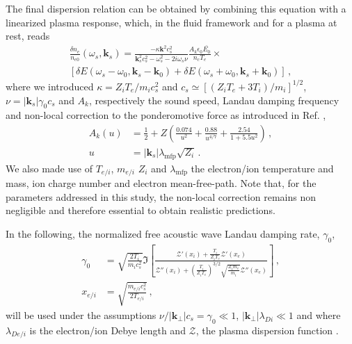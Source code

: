 \documentclass[
 reprint,
 amsmath,amssymb,
 aps,
]{revtex4-1}
\begin{document}
The final dispersion relation  can be obtained by combining this equation with a linearized plasma response, which, in the fluid framework and for a plasma at rest, %
reads 
\begin{align}
   \frac{\delta n_e }{n_{e0}}(\omega_s,\mathbf{k}_s) = \frac{-\kappa\mathbf{k}^2c_s^2}{ \mathbf{k}_s^2c_s^2-\omega_s^2 -2i\omega_s \nu} \frac{A_k\epsilon_0 \bar{E_0}}{n_c T_e}\times \nonumber\\ \left[\delta E(\omega_s-\omega_0, \mathbf{k}_s-\mathbf{k}_0) +\delta E(\omega_s+\omega_0, \mathbf{k}_s+\mathbf{k}_0) \right] \, ,\label{eq:fluid}
\end{align}
where we introduced $\kappa = Z_iT_e/m_ic_s^2$ and  $c_s\simeq [(Z_iT_e+3 T_i)/m_i]^{1/2}$, $\nu=\vert\mathbf{k}_s\vert \gamma_0 c_s$ and $A_k$, respectively  the sound speed, Landau damping frequency and non-local correction to the ponderomotive force  as introduced in Ref. \cite[]{Bychenkov_2000}, 
\begin{align}
     A_k(u)   &= \frac{1}{2} +Z\left( \frac{0.074}{u^2}+ \frac{0.88}{u^{4/7}} + \frac{2.54}{1+5.5u^2} \right) \, ,\nonumber \\ 
     u &=\vert \mathbf{k}_s \vert\lambda_\mathrm{mfp} \sqrt{Z_i}\label{eq:nl}\, .
\end{align}
We also made use of $T_{e/i}$, $m_{e/i}$ $Z_i$ and $\lambda_\mathrm{mfp}$ the electron/ion temperature and mass, ion charge number and electron mean-free-path.
Note that, for the parameters addressed in this study, the non-local correction remains non negligible and therefore essential to obtain realistic predictions.  

In the following, 
the normalized free acoustic wave Landau damping rate, $\gamma_0$, 
\begin{align}
\gamma_0 &= \sqrt{\frac{2T_i }{m_ic_s^2 }} 
\Im\left[
\frac{  \mathcal{Z}'\left(x_i\right) 
+\frac{T_i}{Z_iT_e}  \mathcal{Z}'\left(x_e\right)   }{  \mathcal{Z}''\left(x_i\right) +\left(\frac{T_i}{Z_iT_e}\right)^{3/2}\sqrt{\frac{Z_im_e}{m_i}}  \mathcal{Z}''\left(x_e\right)    }
\right]\, , \nonumber \\
x_{e/i}&=\sqrt{\frac{m_{e/i}c_s^2}{2T_{e/i}}}\, ,\label{eq:g0}
\end{align}
will be used under the assumptions  $\nu/\vert \mathbf{k}_\perp \vert c_s= \gamma_0 \ll 1$, $\vert \mathbf{k}_\perp \vert\lambda_{Di}\ll 1$ and
where $\lambda_{De/i}$ is the electron/ion Debye length and $ \mathcal{Z}$, the plasma dispersion function \cite{Fried_Gell-Mann_1960}.
\end{document}
